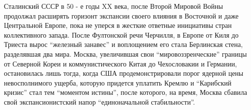 Сталинский СССР в 50 - е годы XX века, после Второй Мировой Войны продолжал
расширять горизонт экспансии своего влияния в Восточной и даже Центральной
Европе, пока не уперся в жесткие ответные инициативы стран коллективного
запада. После Фултонской речи Черчилля, в Европе от Киля до Триеста вырос
\enquote{железный занавес} и воплощением его стала Берлинская стена,
разделявшая два мира. Москва, увеличившая свои \enquote{мировоззренческие}
границы от Северной Кореи и коммунистического Китая до Чехословакии и Германии,
остановилась лишь тогда, когда США продемонстрировали порог ядерной цены
невосполнимого ущерба, которую придется уплатить Кремлю и \enquote{Карибский
кризис} стал тем \enquote{моментом истины}, после которого, на время, Москва
сбавила свой экспансионистский напор \enquote{единоначальной стабильности}.

